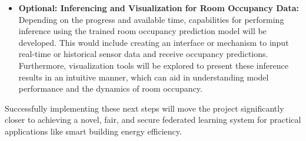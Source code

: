 \begin{itemize}
    \item \textbf{Optional: Inferencing and Visualization for Room Occupancy Data:}
    Depending on the progress and available time, capabilities for performing inference using the trained room occupancy prediction model will be developed. This would include creating an interface or mechanism to input real-time or historical sensor data and receive occupancy predictions. Furthermore, visualization tools will be explored to present these inference results in an intuitive manner, which can aid in understanding model performance and the dynamics of room occupancy.
\end{itemize}

Successfully implementing these next steps will move the project significantly closer to achieving a novel, fair, and secure federated learning system for practical applications like smart building energy efficiency.
